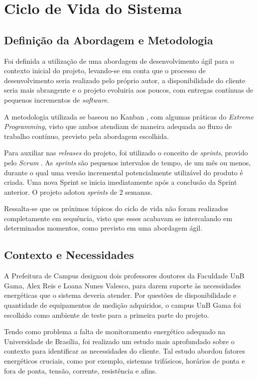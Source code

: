 \chapter{Ciclo de Vida do Sistema}
\section{Definição da Abordagem e Metodologia}
Foi definida a utilização de uma abordagem de desenvolvimento ágil \cite{beck2001agile} para o contexto inicial do projeto, levando-se em conta que o processo de desenvolvimento seria realizado pelo próprio autor, a disponibilidade do cliente seria mais abrangente e o projeto evoluiria aos poucos, com entregas contínuas de pequenos incrementos de \textit{software}.

A metodologia utilizada se baseou no Kanban \cite{radigan_2015}, com algumas práticas do \textit{Extreme Programming}, visto que ambos atendiam de maneira adequada ao fluxo de trabalho contínuo, previsto pela abordagem escolhida.

Para auxiliar nas \textit{releases} do projeto, foi utilizado o conceito de \textit{sprints}, provido pelo \textit{Scrum} \cite{scrum_guide}. As \textit{sprints} são pequenos intervalos de tempo, de um mês ou menos, durante o qual uma versão incremental potencialmente utilizável do produto é criada. Uma nova Sprint se inicia imediatamente após a conclusão da Sprint anterior. O projeto adotou \textit{sprints} de 2 semanas.

Ressalta-se que os próximos tópicos do ciclo de vida não foram realizados completamente em sequência, visto que esses acabavam se intercalando em determinados momentos, como previsto em uma abordagem ágil.

\section{Contexto e Necessidades}
A Prefeitura de Campus designou dois professores doutores da Faculdade UnB Gama, Alex Reis e Loana Nunes Valesco, para darem suporte às necessidades energéticas que o sistema deveria atender. Por questões de disponibilidade e quantidade de equipamentos de medição adquiridos, o campus UnB Gama foi escolhido como ambiente de teste para a primeira parte do projeto.

Tendo como problema a falta de monitoramento energético adequado na Universidade de Brasília, foi realizado um estudo mais aprofundado sobre o contexto para identificar as necessidades do cliente. Tal estudo abordou fatores energéticos cruciais, como por exemplo, sistemas trifásicos, horários de ponta e fora de ponta, tensão, corrente, resistência e afins.

